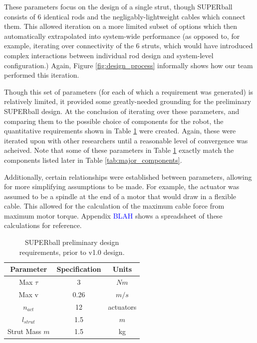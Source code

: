 \documentclass[12pt]{report}
\begin{document}
These parameters focus on the design of a single strut, though SUPERball consists of 6 identical rods and the negligably-lightweight cables which connect them.
This allowed iteration on a more limited subset of options which then automatically extrapolated into system-wide performance (as opposed to, for example, iterating over connectivity of the 6 struts, which would have introduced complex interactions between individual rod design and system-level configuration.)
Again, Figure \ref{fig:design_process} informally shows how our team performed this iteration.



Though this set of parameters (for each of which a requirement was generated) is relatively limited, it provided some greatly-needed grounding for the preliminary SUPERball design.
At the conclusion of iterating over these parameters, and comparing them to the possible choice of components for the robot, the quantitative requirements shown in Table \ref{tab:design_req} were created.
Again, these were iterated upon with other researchers until a reasonable level of convergence was acheived.
Note that some of these parameters in Table \ref{tab:design_req} exactly match the components listed later in Table \ref{tab:major_components}.

Additionally, certain relationships were established between parameters, allowing for more simplifying assumptions to be made.
For example, the actuator was assumed to be a spindle at the end of a motor that would draw in a flexible cable.
This allowed for the calculation of the maximum cable force from maximum motor torque.
Appendix \textcolor{blue}{BLAH} shows a spreadsheet of these calculations for reference.

\begin{table}[ht]
\caption{SUPERball preliminary design requirements, prior to v1.0 design.}%
\label{tab:design_req}%
\begin{center}%
\begin{tabular}{| c | c | c |}
\hline
Parameter & Specification & Units\\ \hline
Max $\tau$ & 3 & $Nm$ \\ \hline
Max v & 0.26 & $m/s$ \\ \hline
$n_{act}$ & 12 & actuators \\ \hline
$l_{strut}$ & 1.5 & $m$ \\ \hline
Strut Mass $m$ & 1.5 & kg \\ \hline
\end{tabular}%
\end{center}
\end{table}
\end{document}
